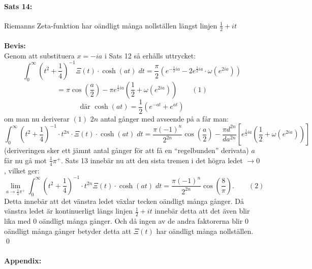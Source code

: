 \documentclass{article}%
\begin{document}
\paragraph{Sats 14:} Riemanns Zeta-funktion har oändligt många nollställen längst linjen $\frac 1 2 + it$ \\
\\
{\bf Bevis:} \\
Genom att substituera $x = -ia$ i Sats 12
så erhålls uttrycket:
\[
	\int_0^\infty (t^2 + \frac 1 4)^{-1} \Xi(t) \cdot \cosh(at) \; dt = \frac \pi 2 (e^{- \frac 1 2 ia} - 2 e^{\frac 1 2 ia}
		\cdot \omega(e^{2ia}))
\]
\[
	= \pi \cos(\frac a 2) - \pi e^{\frac 1 2 ia} (\frac 1 2 + \omega(e^{2 ia})) \qquad (1)
\]
\[
	\text{där } \cosh(at) = \frac 1 2 (e^{-at} + e^{at})
\]
om man nu deriverar $(1)$ $2n$ antal gånger med avseende på a får man:
\[
	\int_0^\infty (t^2 + \frac 1 4)^{-1} \cdot t^{2n} \cdot \Xi(t) \cdot \cosh(at) \; dt = \frac {\pi(-1)^n}{2^{2n}}
		\cos(\frac a 2) - \frac {\pi d^{2n}} {da^{2n}} \left [
			e^{\frac 1 2 ia} (\frac 1 2 + \omega(e^{2ia}))
		\right ]
\]
(deriveringen sker ett jämnt antal gånger för att få en ``regelbunden'' derivata)
$a$ får nu gå mot $\frac 1 4 \pi^+$.
Sats 13 innebär nu att den sista tremen i det högra ledet $\to 0$, vilket ger:
\[
	\lim_{a \to \frac 1 4 \pi^+} \int_0^\infty (t^2 + \frac 1 4)^{-1} \cdot t^{2n}\Xi(t) \cdot \cosh(at) \; dt = 
		\frac {\pi (-1)^n} {2^{2n}} \cos(\frac 8 \pi). \qquad (2)
\]
Detta innebär att det vänstra ledet växlar tecken oändligt många gånger. Då vänstra ledet är kontinuerligt
längs linjen $\frac 1 2 + it$ innebär detta att det även blir lika med $0$ oändligt många gånger.
Och då ingen av de andra faktorerna blir $0$ oändligt många gånger betyder detta att $\Xi(t)$ har oändligt många nollställen.\\
\hfill \qed
\pagebreak
\paragraph{Appendix:}
\end{document}
